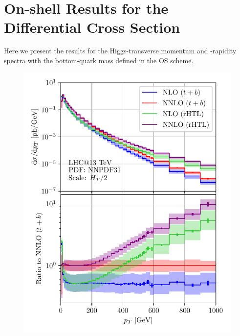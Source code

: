 

\chapter{On-shell Results for the Differential Cross Section}\label{app:4}

Here we present the results for the Higgs-transverse momentum and -rapidity spectra with the bottom-quark mass defined in the \acs{OS} scheme.
\begin{figure}[h]
\begin{minipage}[t]{0.49\textwidth}
  \includegraphics[width=\textwidth]{Images/pT_13000_bOS_tOS.pdf}
\end{minipage}
\begin{minipage}[t]{0.49\textwidth}

\end{minipage}
\end{figure}

